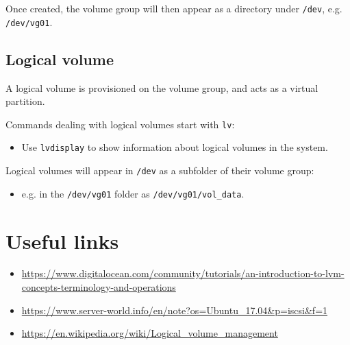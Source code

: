 \documentclass[slides]{pgnotes}
\begin{document}
Once created, the volume group will then appear as a directory under \texttt{/dev}, e.g. \texttt{/dev/vg01}.

\subsection{Logical volume}

A logical volume is provisioned on the volume group, and acts as a virtual partition.

Commands dealing with logical volumes start with \texttt{lv}:
\begin{itemize}
\item Use \texttt{lvdisplay} to show information about logical volumes in the system.
\end{itemize}

Logical volumes will appear in \texttt{/dev} as a subfolder of their volume group:
\begin{itemize}
\item e.g. in the \texttt{/dev/vg01} folder as \texttt{/dev/vg01/vol\_data}.
\end{itemize}




\section{Useful links}\label{useful-links}

\begin{itemize}
\item
  \url{https://www.digitalocean.com/community/tutorials/an-introduction-to-lvm-concepts-terminology-and-operations}
\item
  \url{https://www.server-world.info/en/note?os=Ubuntu_17.04\&p=iscsi\&f=1}
\item
  \url{https://en.wikipedia.org/wiki/Logical_volume_management}
\end{itemize}
\end{document}
